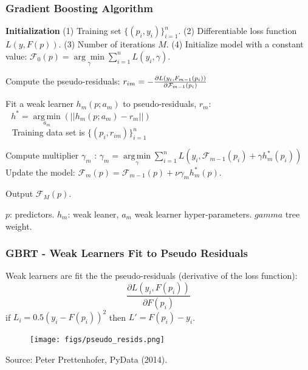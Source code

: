 \documentclass[t, pdftex]{beamer}
\begin{document}
\begin{frame}
\frametitle{Gradient Boosting Algorithm}
\vspace{-20pt}
\begin{algorithm}[H]
    \tiny  
    \begin{algorithmic}[1]
        \STATE \textbf{Initialization} 
        \STATE (1) Training set $\{(p_i, y_i)\}_{i=1}^n$. 
        \STATE (2) Differentiable loss function $L(y, F(p))$. 
        \STATE (3) Number of iterations ${{M}}$.
        \STATE (4)   Initialize model with a constant value:
        $\mathcal F_0(p) = \underset{\gamma}{\arg\min} \sum_{i=1}^n L(y_i, \gamma).$
        
        \STATE Compute the pseudo-residuals:  
        \STATE $r_{im} = -\frac{\partial L(y_i, \mathcal \mathcal F_{m-1}(p_i))}{\partial \mathcal F_{m-1}(p_i)}$
        \ENDFOR
        
        \STATE Fit a weak learner $h_m(p; a_m)$ to pseudo-residuals, $r_{m}$: \\
        $\ \ \ h^* = \underset{a_m}{\operatorname{arg\,min}}(||h_m(p; a_m) - r_m||)$ \\
        $\ \ $ Training data set is $\{(p_i, r_{im})\}_{i=1}^n$ \;
        
        \STATE Compute multiplier $\gamma_m$ :
        $\gamma_m = \underset{\gamma}{\operatorname{arg\,min}} \sum_{i=1}^n L\left(y_i, \mathcal F_{m-1}(p_i) + \gamma h^*_m(p_i)\right)$\;
        \STATE Update the model:
        $\mathcal F_m(p) = \mathcal F_{m-1}(p) + \nu \gamma_m h^*_m(p).$
        
        \ENDFOR
        \STATE Output $\mathcal F_M(p).$
    \end{algorithmic}
    \label{alg:boosting}
\end{algorithm}
$p$: predictors. $h_m$: weak leaner, $a_m$ weak learner hyper-parameters.  $gamma$ tree weight. 
\cite{friedman2001}
\end{frame}

\begin{frame}
\frametitle{GBRT - Weak Learners Fit to Pseudo Residuals}
Weak learners are fit the the pseudo-residuals (derivative of the loss function): 
\[
\frac{\partial L(y_i, F(p_i))}{\partial F(p_i)}
\]
if $L_i=0.5(y_i-F(p_i))^2$ then $L' = F(p_i)-y_i$.  
\begin{figure}[!htbp]
\centering
\texttt{[image: figs/pseudo\_resids.png]}
\label{model_overview}
\end{figure}
Source: Peter Prettenhofer, PyData (2014).
\end{frame}
\end{document}
